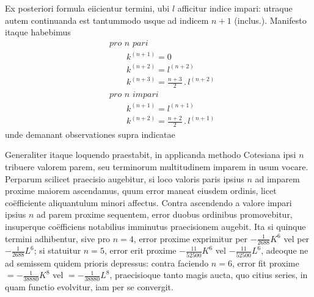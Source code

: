 Ex posteriori formula eiicientur termini, ubi $l$ afficitur indice impari: utraque
autem continuanda est tantummodo usque ad indicem $n+1$ (inclus.). Manifesto
itaque habebimus
\[
\begin{aligned}
&\textit{pro $n$ pari}\\
&\qquad k^{(n+1)}=0\\
&\qquad k^{(n+2)}=l^{(n+2)}\\
&\qquad k^{(n+3)}=\frac{n+3}{2}\mathbin{.}l^{(n+2)}\\
&\textit{pro $n$ impari}\\
&\qquad k^{(n+1)}=l^{(n+1)}\\
&\qquad k^{(n+2)}=\frac{n+2}{2}\mathbin{.}l^{(n+1)}
\end{aligned}
\]
unde demanant observationes supra indicatae

Generaliter itaque loquendo praestabit, in applicanda methodo Cotesiana
ipsi $n$ tribuere valorem parem, seu terminorum multitudinem imparem in usum
vocare. Perparum scilicet praecisio augebitur, si loco valoris paris ipsius $n$ ad
imparem proxime maiorem ascendamus, quum error maneat eiusdem ordinis, licet
coëfficiente aliquantulum minori affectus. Contra ascendendo a valore impari
ipsius $n$ ad parem proxime sequentem, error duobus ordinibus promovebitur,
insuperque coëfficiens notabilius imminutus praecisionem augebit. Ita si quinque
termini adhibentur, sive pro $n=4$, error proxime exprimitur per $-\frac{1}{2688}K^6$
vel per $-\frac{1}{2688}L^6$; si statuitur $n=5$, error erit proxime $-\frac{11}{52500}K^6$ vel
$-\frac{11}{52500}L^6$, adeoque ne ad semissem quidem prioris depressus: contra faciendo
$n=6$, error fit proxime $=-\frac{1}{38880}K^8$ vel $=-\frac{1}{38880}L^8$, praecisioque tanto
magis aucta, quo citius series, in quam functio evolvitur, iam per se convergit.


